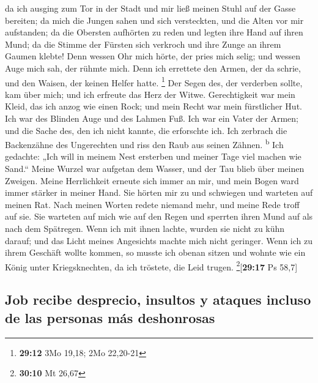 da ich ausging zum Tor in der Stadt und mir ließ meinen
Stuhl auf der Gasse bereiten;  da mich die Jungen sahen
und sich versteckten, und die Alten vor mir aufstanden; 
da die Obersten aufhörten zu reden und legten ihre Hand auf ihren Mund;
 da die Stimme der Fürsten sich verkroch und ihre Zunge
an ihrem Gaumen klebte!  Denn wessen Ohr mich hörte, der
pries mich selig; und wessen Auge mich sah, der rühmte mich.
 Denn ich errettete den Armen, der da schrie, und den
Waisen, der keinen Helfer hatte. \footnote{\textbf{29:12} 3Mo 19,18; 2Mo
  22,20-21}  Der Segen des, der verderben sollte, kam
über mich; und ich erfreute das Herz der Witwe. 
Gerechtigkeit war mein Kleid, das ich anzog wie einen Rock; und mein
Recht war mein fürstlicher Hut.  Ich war des Blinden Auge
und des Lahmen Fuß.  Ich war ein Vater der Armen; und die
Sache des, den ich nicht kannte, die erforschte ich.  Ich
zerbrach die Backenzähne des Ungerechten und riss den Raub aus seinen
Zähnen. \textsuperscript{b}  Ich gedachte: „Ich will in
meinem Nest ersterben und meiner Tage viel machen wie Sand.``
 Meine Wurzel war aufgetan dem Wasser, und der Tau blieb
über meinen Zweigen.  Meine Herrlichkeit erneute sich
immer an mir, und mein Bogen ward immer stärker in meiner Hand.
 Sie hörten mir zu und schwiegen und warteten auf meinen
Rat.  Nach meinen Worten redete niemand mehr, und meine
Rede troff auf sie.  Sie warteten auf mich wie auf den
Regen und sperrten ihren Mund auf als nach dem Spätregen.
 Wenn ich mit ihnen lachte, wurden sie nicht zu kühn
darauf; und das Licht meines Angesichts machte mich nicht geringer.
 Wenn ich zu ihrem Geschäft wollte kommen, so musste ich
obenan sitzen und wohnte wie ein König unter Kriegsknechten, da ich
tröstete, die Leid trugen. \footnote{\textbf{30:10} Mt 26,67}{[}\textbf{29:17}
Ps 58,7{]}

\hypertarget{job-recibe-desprecio-insultos-y-ataques-incluso-de-las-personas-muxe1s-deshonrosas}{%
\subsection{Job recibe desprecio, insultos y ataques incluso de las
personas más
deshonrosas}\label{job-recibe-desprecio-insultos-y-ataques-incluso-de-las-personas-muxe1s-deshonrosas}}

